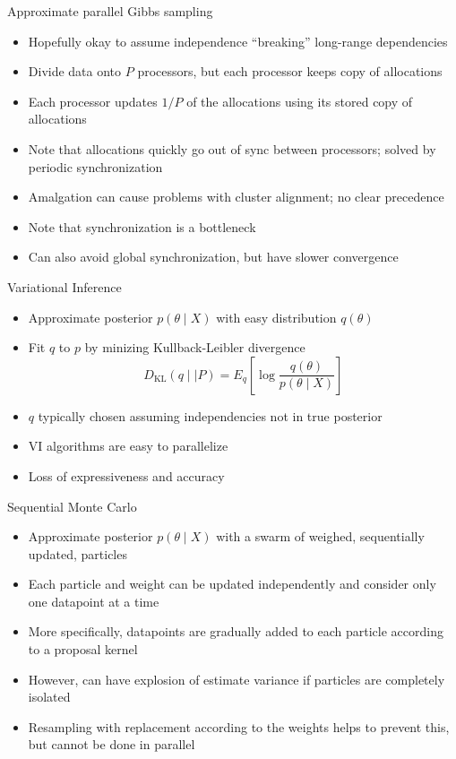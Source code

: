 \documentclass{beamer}
\begin{document}
  \begin{frame}{Approximate parallel Gibbs sampling}
    \begin{itemize}
      \item Hopefully okay to assume independence ``breaking'' long-range dependencies
      \item Divide data onto $P$ processors, but each processor keeps copy of allocations
      \item Each processor updates $1/P$ of the allocations using its stored copy of allocations
      \item Note that allocations quickly go out of sync between processors; solved by periodic synchronization
      \item Amalgation can cause problems with cluster alignment; no clear precedence
      \item Note that synchronization is a bottleneck
      \item Can also avoid global synchronization, but have slower convergence
    \end{itemize}
  \end{frame}

  \begin{frame}{Variational Inference}
    \begin{itemize}
      \item Approximate posterior $p(\theta\mid X)$ with easy distribution $q(\theta)$
      \item Fit $q$ to $p$ by minizing Kullback-Leibler divergence $$D_\text{KL}(q \mid\mid P) = E_q\left[\log\frac{q(\theta)}{p(\theta\mid X)}\right]$$
      \item $q$ typically chosen assuming independencies not in true posterior
      \item VI algorithms are easy to parallelize
      \item Loss of expressiveness and accuracy
    \end{itemize}
  \end{frame}

  \begin{frame}{Sequential Monte Carlo}
    \begin{itemize}
      \item Approximate posterior $p(\theta\mid X)$ with a swarm of weighed, sequentially updated, particles
      \item Each particle and weight can be updated independently and consider only one datapoint at a time
      \item More specifically, datapoints are gradually added to each particle according to a proposal kernel
      \item However, can have explosion of estimate variance if particles are completely isolated
      \item Resampling with replacement according to the weights helps to prevent this, but cannot be done in parallel
    \end{itemize}
  \end{frame}
\end{document}
